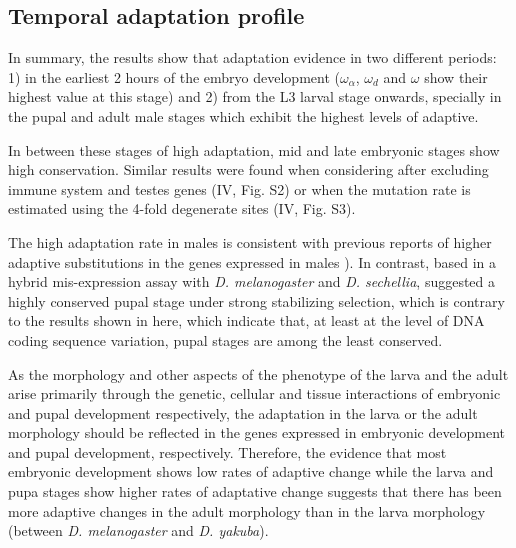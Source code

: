 
\subsection{Temporal adaptation profile}

In summary, the results show that adaptation evidence in two different periods: 
1) in the earliest 2 hours of the embryo development ($\omega_{\alpha}$, $\omega_{d}$ and $\omega$ show their highest value at this stage) and 
2) from the L3 larval stage onwards, specially in the pupal and adult male stages which exhibit the highest levels of adaptive.

In between these stages of high adaptation, mid and late embryonic stages show high conservation. 
Similar results were found when considering after excluding immune system and testes genes (IV, Fig. S2) or when the mutation rate is estimated using the 4-fold degenerate sites (IV, Fig. S3).

The high adaptation rate in males is consistent with previous reports of higher adaptive substitutions in the genes expressed in males \citealp{Proschel2006,Haerty2007}). 
In contrast, based in a hybrid mis-expression assay with \textit{D. melanogaster} and \textit{D. sechellia}, \citet{Artieri2010} suggested a highly conserved pupal stage under strong stabilizing selection, which is contrary to the results shown in here, which indicate that, at least at the level of DNA coding sequence variation, pupal stages are among the least conserved.

As the morphology and other aspects of the phenotype of the larva and the adult arise primarily through the genetic, cellular and tissue interactions of embryonic and pupal development respectively, the adaptation in the larva or the adult morphology should be reflected in the genes expressed in embryonic development and pupal development, respectively.
Therefore, the evidence that most embryonic development shows low rates of adaptive change while the larva and pupa stages show higher rates of adaptative change suggests that there has been more adaptive changes in the adult morphology than in the larva morphology (between \textit{D. melanogaster} and \textit{D. yakuba}).

